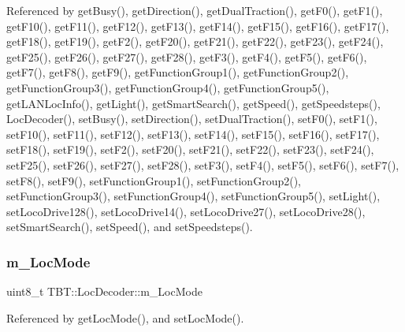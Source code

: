 Referenced by get\+Busy(), get\+Direction(), get\+Dual\+Traction(), get\+F0(), get\+F1(), get\+F10(), get\+F11(), get\+F12(), get\+F13(), get\+F14(), get\+F15(), get\+F16(), get\+F17(), get\+F18(), get\+F19(), get\+F2(), get\+F20(), get\+F21(), get\+F22(), get\+F23(), get\+F24(), get\+F25(), get\+F26(), get\+F27(), get\+F28(), get\+F3(), get\+F4(), get\+F5(), get\+F6(), get\+F7(), get\+F8(), get\+F9(), get\+Function\+Group1(), get\+Function\+Group2(), get\+Function\+Group3(), get\+Function\+Group4(), get\+Function\+Group5(), get\+L\+A\+N\+Loc\+Info(), get\+Light(), get\+Smart\+Search(), get\+Speed(), get\+Speedsteps(), Loc\+Decoder(), set\+Busy(), set\+Direction(), set\+Dual\+Traction(), set\+F0(), set\+F1(), set\+F10(), set\+F11(), set\+F12(), set\+F13(), set\+F14(), set\+F15(), set\+F16(), set\+F17(), set\+F18(), set\+F19(), set\+F2(), set\+F20(), set\+F21(), set\+F22(), set\+F23(), set\+F24(), set\+F25(), set\+F26(), set\+F27(), set\+F28(), set\+F3(), set\+F4(), set\+F5(), set\+F6(), set\+F7(), set\+F8(), set\+F9(), set\+Function\+Group1(), set\+Function\+Group2(), set\+Function\+Group3(), set\+Function\+Group4(), set\+Function\+Group5(), set\+Light(), set\+Loco\+Drive128(), set\+Loco\+Drive14(), set\+Loco\+Drive27(), set\+Loco\+Drive28(), set\+Smart\+Search(), set\+Speed(), and set\+Speedsteps().

\mbox{\label{classTBT_1_1LocDecoder_a196fc5289b1ea2c9439b385770692c92_a196fc5289b1ea2c9439b385770692c92}} 
\subsubsection{\texorpdfstring{m\+\_\+\+Loc\+Mode}{m\_LocMode}}
{\footnotesize\ttfamily uint8\+\_\+t T\+B\+T\+::\+Loc\+Decoder\+::m\+\_\+\+Loc\+Mode\hspace{0.3cm}{\ttfamily [private]}}



Referenced by get\+Loc\+Mode(), and set\+Loc\+Mode().

\mbox{\label{classTBT_1_1LocDecoder_ae64b66588acb7e0d3084afd9eece57af_ae64b66588acb7e0d3084afd9eece57af}} 
